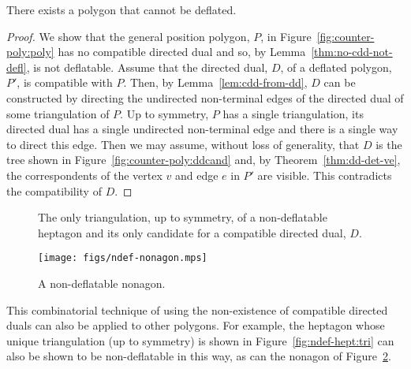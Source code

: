 \documentclass{patmorin}
\begin{document}
\begin{theorem}
  There exists a polygon that cannot be deflated.
\end{theorem}
\begin{proof}
  We show that the general position polygon, $P$, in
  Figure~\ref{fig:counter-poly:poly} has no compatible directed dual
  and so, by Lemma~\ref{thm:no-cdd-not-defl}, is not deflatable.
  Assume that the directed dual, $D$, of a deflated polygon, $P'$, is
  compatible with $P$.  Then, by Lemma~\ref{lem:cdd-from-dd}, $D$ can
  be constructed by directing the undirected non-terminal edges of the
  directed dual of some triangulation of $P$.  Up to symmetry, $P$ has
  a single triangulation, its directed dual has a single undirected
  non-terminal edge and there is a single way to direct this edge.
  Then we may assume, without loss of generality, that $D$ is the tree
  shown in Figure~\ref{fig:counter-poly:ddcand} and, by
  Theorem~\ref{thm:dd-det-ve}, the correspondents of the vertex $v$
  and edge $e$ in $P'$ are visible.  This contradicts the
  compatibility of $D$.
\end{proof}


\iffullversion

\begin{figure}[htb]
  \centering
  \quad
  \caption{\protect{} The only triangulation,
    up to symmetry, of a non-deflatable heptagon
    and \protect{} its only candidate for a
    compatible directed dual, $D$.}
  \label{fig:ndef-hept}
\end{figure}

\begin{figure}[htb]
  \centering
  \texttt{[image: figs/ndef-nonagon.mps]}
  \caption{A non-deflatable nonagon.}
  \label{fig:ndef-non}
\end{figure}

This combinatorial technique of using the non-existence of compatible
directed duals can also be applied to other polygons.  For example,
the heptagon whose unique triangulation (up to symmetry) is shown in
Figure~\ref{fig:ndef-hept:tri} can also be shown to be non-deflatable
in this way, as can the nonagon of Figure~\ref{fig:ndef-non}.
\end{document}
